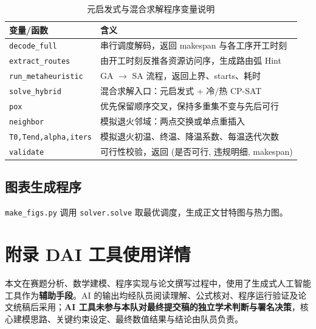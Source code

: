 \documentclass[12pt,a4paper]{ctexart}
\begin{document}
\begin{table}[H]
\centering
\caption{元启发式与混合求解程序变量说明}\label{tab:var-heur}
\begin{tabular}{p{3.4cm} p{11.1cm}}
\toprule
\textbf{变量/函数} & \textbf{含义} \\
\midrule
\texttt{decode\_full} & 串行调度解码，返回 makespan 与各工序开工时刻 \\
\texttt{extract\_routes} & 由开工时刻反推各资源访问序，生成路由弧 Hint \\
\texttt{run\_metaheuristic} & GA $\rightarrow$ SA 流程，返回上界、starts、耗时 \\
\texttt{solve\_hybrid} & 混合求解入口：元启发式 + 冷/热 CP-SAT \\
\texttt{pox} & 优先保留顺序交叉，保持多重集不变与先后可行 \\
\texttt{neighbor} & 模拟退火邻域：两点交换或单点重插入 \\
\texttt{T0,Tend,alpha,iters} & 模拟退火初温、终温、降温系数、每温迭代次数 \\
\texttt{validate} & 可行性校验，返回 (是否可行, 违规明细, makespan) \\
\bottomrule
\end{tabular}
\end{table}






\subsection*{图表生成程序}
\noindent\texttt{make\_figs.py} 调用 \texttt{solver.solve} 取最优调度，生成正文甘特图与热力图。



\section{附录 D\quad AI 工具使用详情}\label{app:ai}

本文在赛题分析、数学建模、程序实现与论文撰写过程中，使用了生成式人工智能工具作为\textbf{辅助手段}。AI 的输出均经队员阅读理解、公式核对、程序运行验证及论文统稿后采用；\textbf{AI 工具未参与本队对最终提交稿的独立学术判断与署名决策}，核心建模思路、关键约束设定、最终数值结果与结论由队员负责。
\end{document}
